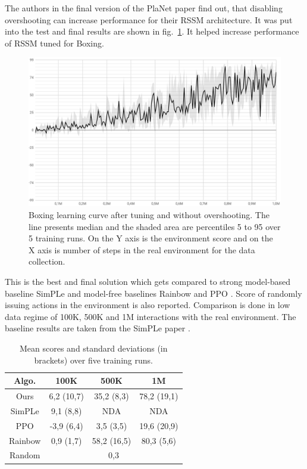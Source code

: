 The authors in the final version of the PlaNet paper find out, that disabling overshooting can increase performance for their RSSM architecture. It was put into the test and final results are shown in fig.~\ref{Fig.Boxing_without_overshooting}. It helped increase performance of RSSM tuned for Boxing.

\begin{figure}[H]
\includegraphics[width=1\textwidth,keepaspectratio]{figures/PlaNet/Boxing_without_overshooting.png}
\caption[Boxing learning curve after tuning and without overshooting]{Boxing learning curve after tuning and without overshooting. The line presents median and the shaded area are percentiles 5 to 95 over 5 training runs. On the Y axis is the environment score and on the X axis is number of steps in the real environment for the data collection.}
\label{Fig.Boxing_without_overshooting}
\end{figure}

This is the best and final solution which gets compared to strong model-based baseline SimPLe \cite{Algo.SimPLe} and model-free baselines Rainbow \cite{Algo.Rainbow} and PPO \cite{Algo.PPO}. Score of randomly issuing actions in the environment is also reported. Comparison is done in low data regime of 100K, 500K and 1M interactions with the real environment. The baseline results are taken from the SimPLe paper \cite{Algo.SimPLe}.

\begin{table}[H]
\centering
\begin{tabular}{|c | c c c|} 
\hline
Algo.   & 100K        & 500K        & 1M          \\
\hline
Ours    &  6,2 (10,7) & 35,2  (8,3) & 78,2 (19,1) \\ 
SimPLe  &  9,1  (8,8) & NDA         & NDA         \\
PPO     & -3,9  (6,4) &  3,5  (3,5) & 19,6 (20,9) \\
Rainbow &  0,9  (1,7) & 58,2 (16,5) & 80,3  (5,6) \\
Random  & \multicolumn{3}{c|}{0,3}                \\
\hline
\end{tabular}
\caption[Results comparison]{Mean scores and standard deviations (in brackets) over five training runs.}
\label{Table.Results}
\end{table}

